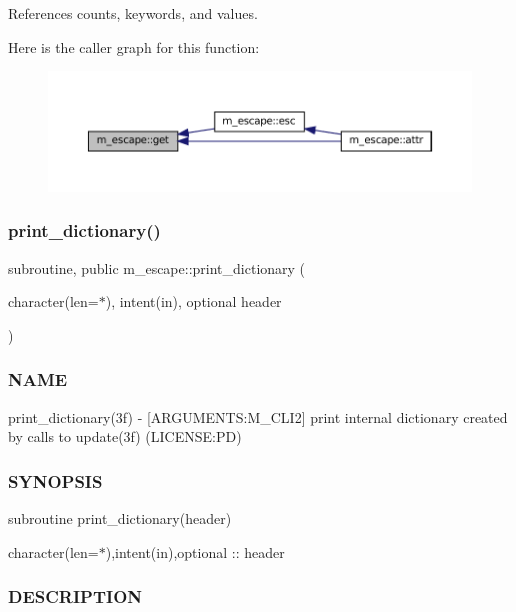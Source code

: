 References counts, keywords, and values.

Here is the caller graph for this function\+:\nopagebreak
\begin{figure}[H]
\begin{center}
\leavevmode
\includegraphics[width=350pt]{namespacem__escape_af555c90c278ff964d8bce93ee0368a42_icgraph}
\end{center}
\end{figure}
\mbox{\label{namespacem__escape_a6add907828fd34e94b87f643a5cabc64}} 
\subsubsection{\texorpdfstring{print\+\_\+dictionary()}{print\_dictionary()}}
{\footnotesize\ttfamily subroutine, public m\+\_\+escape\+::print\+\_\+dictionary (\begin{DoxyParamCaption}\item[{character(len=$\ast$), intent(in), optional}]{header }\end{DoxyParamCaption})}



\subsubsection*{N\+A\+ME}

print\+\_\+dictionary(3f) -\/ \mbox{[}A\+R\+G\+U\+M\+E\+N\+TS\+:M\+\_\+\+C\+L\+I2\mbox{]} print internal dictionary created by calls to update(3f) (L\+I\+C\+E\+N\+SE\+:PD) \subsubsection*{S\+Y\+N\+O\+P\+S\+IS}

subroutine print\+\_\+dictionary(header)

character(len=$\ast$),intent(in),optional \+:\+: header \subsubsection*{D\+E\+S\+C\+R\+I\+P\+T\+I\+ON}

